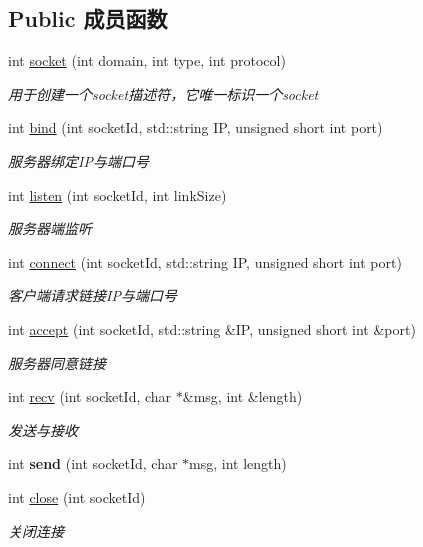 \subsection*{Public 成员函数}
\begin{DoxyCompactItemize}
\item 
int \hyperlink{class_c_service_ae632f34f3aceab829b89ee46374658f2}{socket} (int domain, int type, int protocol)
\begin{DoxyCompactList}\small\item\em 用于创建一个socket描述符，它唯一标识一个socket \end{DoxyCompactList}\item 
int \hyperlink{class_c_service_ab345d03f1f85d053472b05de3ea211eb}{bind} (int socket\+Id, std\+::string IP, unsigned short int port)
\begin{DoxyCompactList}\small\item\em 服务器绑定\+I\+P与端口号 \end{DoxyCompactList}\item 
int \hyperlink{class_c_service_a32f59bebc1aef849f38b72218a87c674}{listen} (int socket\+Id, int link\+Size)
\begin{DoxyCompactList}\small\item\em 服务器端监听 \end{DoxyCompactList}\item 
int \hyperlink{class_c_service_a4788fc741e72baeaa5e15e459494f661}{connect} (int socket\+Id, std\+::string IP, unsigned short int port)
\begin{DoxyCompactList}\small\item\em 客户端请求链接\+I\+P与端口号 \end{DoxyCompactList}\item 
int \hyperlink{class_c_service_a694c7ac8c230b0d1d11bc98a32abcd71}{accept} (int socket\+Id, std\+::string \&IP, unsigned short int \&port)
\begin{DoxyCompactList}\small\item\em 服务器同意链接 \end{DoxyCompactList}\item 
\mbox{\label{class_c_service_a221d063aa8a89ecc84084e1bbd287210}} 
int \hyperlink{class_c_service_a221d063aa8a89ecc84084e1bbd287210}{recv} (int socket\+Id, char $\ast$\&msg, int \&length)
\begin{DoxyCompactList}\small\item\em 发送与接收 \end{DoxyCompactList}\item 
\mbox{\label{class_c_service_a883e80cc5ea699e8408bbffe7c18414b}} 
int {\bfseries send} (int socket\+Id, char $\ast$msg, int length)
\item 
int \hyperlink{class_c_service_abb0357bf57a735cc27f0e667d7e21787}{close} (int socket\+Id)
\begin{DoxyCompactList}\small\item\em 关闭连接 \end{DoxyCompactList}\end{DoxyCompactItemize}


